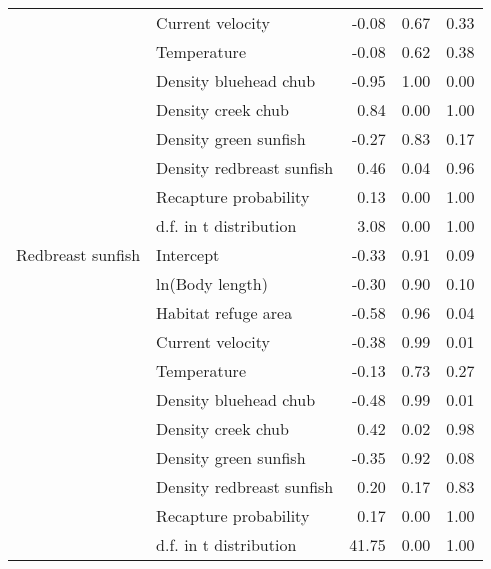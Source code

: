 \begin{table}[ht]
\begin{tabular}{llrrr}
   & Current velocity & -0.08 & 0.67 & 0.33 \\ 
   & Temperature & -0.08 & 0.62 & 0.38 \\ 
   & Density bluehead chub & -0.95 & 1.00 & 0.00 \\ 
   & Density creek chub & 0.84 & 0.00 & 1.00 \\ 
   & Density green sunfish & -0.27 & 0.83 & 0.17 \\ 
   & Density redbreast sunfish & 0.46 & 0.04 & 0.96 \\ 
   & Recapture probability & 0.13 & 0.00 & 1.00 \\ 
   & d.f. in t distribution & 3.08 & 0.00 & 1.00 \\ 
  Redbreast sunfish & Intercept & -0.33 & 0.91 & 0.09 \\ 
   & ln(Body length) & -0.30 & 0.90 & 0.10 \\ 
   & Habitat refuge area & -0.58 & 0.96 & 0.04 \\ 
   & Current velocity & -0.38 & 0.99 & 0.01 \\ 
   & Temperature & -0.13 & 0.73 & 0.27 \\ 
   & Density bluehead chub & -0.48 & 0.99 & 0.01 \\ 
   & Density creek chub & 0.42 & 0.02 & 0.98 \\ 
   & Density green sunfish & -0.35 & 0.92 & 0.08 \\ 
   & Density redbreast sunfish & 0.20 & 0.17 & 0.83 \\ 
   & Recapture probability & 0.17 & 0.00 & 1.00 \\ 
   & d.f. in t distribution & 41.75 & 0.00 & 1.00 \\ 
   \hline
\end{tabular}
\end{table}
